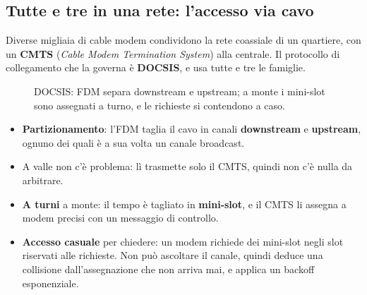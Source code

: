\subsection{Tutte e tre in una rete: l'accesso via cavo}

Diverse migliaia di cable modem condividono la rete coassiale di un quartiere, con un \textbf{CMTS} (\emph{Cable Modem Termination
System}) alla centrale. Il protocollo di collegamento che la governa è \textbf{DOCSIS}, e usa tutte e tre le famiglie.

\begin{figure}[H]
\centering
{}
\caption{DOCSIS: FDM separa downstream e upstream; a monte i mini-slot sono assegnati a turno, e le richieste si contendono a caso.}
\end{figure}

\begin{itemize}
    \item \textbf{Partizionamento}: l'FDM taglia il cavo in canali \textbf{downstream} e \textbf{upstream}, ognuno dei quali è a sua volta
          un canale broadcast.
    \item A valle non c'è problema: lì trasmette solo il CMTS, quindi non c'è nulla da arbitrare.
    \item \textbf{A turni} a monte: il tempo è tagliato in \textbf{mini-slot}, e il CMTS li assegna a modem precisi con un messaggio di
          controllo.
    \item \textbf{Accesso casuale} per chiedere: un modem richiede dei mini-slot negli slot riservati alle richieste. Non può ascoltare
          il canale, quindi deduce una collisione dall'assegnazione che non arriva mai, e applica un backoff esponenziale.
\end{itemize}


